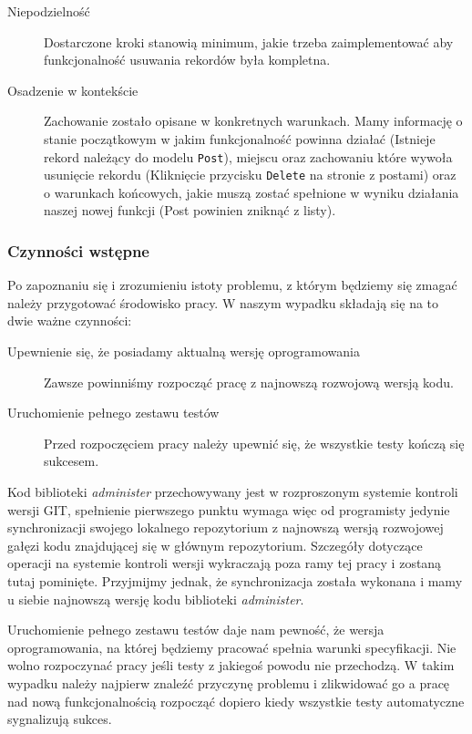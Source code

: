     \begin{description}
      \item[Niepodzielność] Dostarczone kroki stanowią minimum, jakie trzeba zaimplementować aby funkcjonalność usuwania rekordów była kompletna.
      \item[Osadzenie w kontekście] Zachowanie zostało opisane w konkretnych warunkach. Mamy informację o stanie początkowym w jakim funkcjonalność powinna działać (Istnieje rekord należący do modelu \texttt{Post}), miejscu oraz zachowaniu które wywoła usunięcie rekordu (Kliknięcie przycisku \texttt{Delete} na stronie z postami) oraz o warunkach końcowych, jakie muszą zostać spełnione w wyniku działania naszej nowej funkcji (Post powinien zniknąć z listy).
    \end{description}
  	
  	\subsubsection{Czynności wstępne}
  	
  	Po zapoznaniu się i zrozumieniu istoty problemu, z którym będziemy się zmagać należy przygotować środowisko pracy. W naszym wypadku składają się na to dwie ważne czynności:
  	
  	 \begin{description}
        \item[Upewnienie się, że posiadamy aktualną wersję oprogramowania] Zawsze powinniśmy rozpocząć pracę z najnowszą rozwojową wersją kodu.
        \item[Uruchomienie pełnego zestawu testów] Przed rozpoczęciem pracy należy upewnić się, że wszystkie testy kończą się sukcesem.
      \end{description}
      
    Kod biblioteki \emph{administer} przechowywany jest w rozproszonym systemie kontroli wersji GIT, spełnienie pierwszego punktu wymaga więc od programisty jedynie synchronizacji swojego lokalnego repozytorium z najnowszą wersją rozwojowej gałęzi kodu znajdującej się w głównym repozytorium. Szczegóły dotyczące operacji na systemie kontroli wersji wykraczają poza ramy tej pracy i zostaną tutaj pominięte. Przyjmijmy jednak, że synchronizacja została wykonana i mamy u siebie najnowszą wersję kodu biblioteki \emph{administer}. 
    
    Uruchomienie pełnego zestawu testów daje nam pewność, że wersja oprogramowania, na której będziemy pracować spełnia warunki specyfikacji. Nie wolno rozpoczynać pracy jeśli testy z jakiegoś powodu nie przechodzą. W takim wypadku należy najpierw znaleźć przyczynę problemu i zlikwidować go a pracę nad nową funkcjonalnością rozpocząć dopiero kiedy wszystkie testy automatyczne sygnalizują sukces.
    
